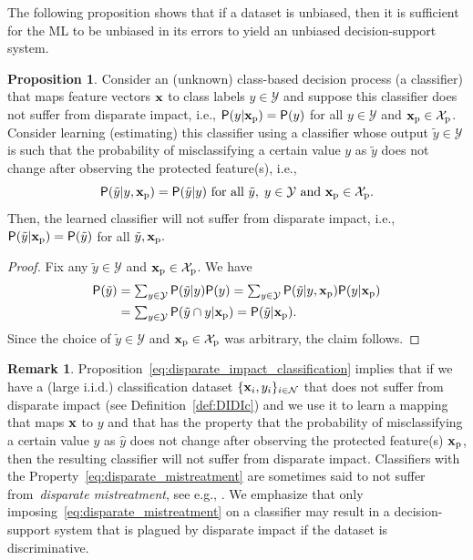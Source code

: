 \documentclass[letterpaper]{article} %
\theoremstyle{definition}
\newtheorem{remark}{Remark}[section]
\newtheorem{proposition}{Proposition}[section]
\newcommand{\1}{\ensuremath{{\rm e}}} %
\newcommand{\PR}{\ensuremath{\mathsf{P}}} %
\newcommand{\prx}{{\bf x}_{\rm p}}
\newcommand{\prX}{{\mathcal X}_{\rm p}}
\begin{document}
The following proposition shows that if a dataset is unbiased, then it is sufficient for the ML to be unbiased in its errors to yield an unbiased decision-support system.
\begin{proposition}
Consider an (unknown) class-based decision process (a classifier) that maps feature vectors ${\bf x}$ to class labels $y\in \mathcal Y$ and suppose this classifier does not suffer from disparate impact, i.e., $\PR(  y |  \prx ) = \PR( y )$ for all $y \in \mathcal Y$ and $\prx \in \prX$.
Consider learning (estimating) this classifier using a classifier whose output $\tilde y \in \mathcal Y$ is such that the probability of misclassifying a certain value $y$ as $\tilde y$ does not change after observing the protected feature(s), i.e.,
\begin{equation}
\PR( \tilde y |  y, \prx ) = \PR( \tilde y |  y) \text{ for all } \tilde y, \; y \in \mathcal Y \text { and } \prx \in \prX.
\label{eq:disparate_mistreatment}
\end{equation}
Then, the learned classifier will not suffer from disparate impact, i.e., 
$
\PR( \tilde y |  \prx ) = \PR( \tilde y )$ for all $\tilde y,\prx.
$
\label{prop:relation_to_disparate_mistreatment}
\end{proposition}

\begin{proof}
Fix any $\tilde y \in \mathcal Y$ and $\prx \in \prX$. We have
%
\begin{align*}
\PR( \tilde y )  &= \textstyle \sum_{y \in \mathcal Y} \PR ( \tilde y | y ) \PR(y)
=  \sum_{y \in \mathcal Y} \PR ( \tilde y | y , \prx ) \PR(y | \prx )\\
&= \textstyle \sum_{y \in \mathcal Y} \PR ( \tilde y \cap y | \prx )
 = \PR( \tilde y |  \prx ).
\end{align*}
%
Since the choice of $\tilde y \in \mathcal Y$ and $\prx \in \prX$ was arbitrary, the claim follows.
\end{proof}
\begin{remark}
Proposition~\eqref{eq:disparate_impact_classification} implies that if we have a (large i.i.d.) classification dataset $\{ {\bf x}_i, y_i \}_{i\in \mathcal N}$ that does not suffer from disparate impact (see Definition~\ref{def:DIDIc}) and we use it to learn a mapping that maps ${\bf x}$ to $y$ and that has the property that the probability of misclassifying a certain value $y$ as $\hat y$ does not change after observing the protected feature(s) $\prx$, then the resulting classifier will not suffer from disparate impact. Classifiers with the Property~\eqref{eq:disparate_mistreatment} are sometimes said to not suffer from~\emph{disparate mistreatment}, see e.g., \cite{Bilal:2016}. We emphasize that only imposing~\eqref{eq:disparate_mistreatment} on a classifier may result in a decision-support system that is plagued by disparate impact if the dataset is discriminative.
\end{remark}
\end{document}
